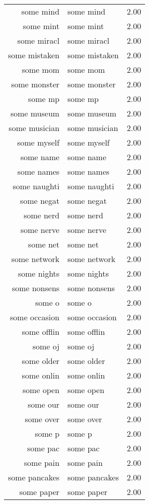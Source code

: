 \begin{table}[ht]
\begin{tabular}{rlr}
  some mind & some mind & 2.00 \\ 
  some mint & some mint & 2.00 \\ 
  some miracl & some miracl & 2.00 \\ 
  some mistaken & some mistaken & 2.00 \\ 
  some mom & some mom & 2.00 \\ 
  some monster & some monster & 2.00 \\ 
  some mp & some mp & 2.00 \\ 
  some museum & some museum & 2.00 \\ 
  some musician & some musician & 2.00 \\ 
  some myself & some myself & 2.00 \\ 
  some name & some name & 2.00 \\ 
  some names & some names & 2.00 \\ 
  some naughti & some naughti & 2.00 \\ 
  some negat & some negat & 2.00 \\ 
  some nerd & some nerd & 2.00 \\ 
  some nerve & some nerve & 2.00 \\ 
  some net & some net & 2.00 \\ 
  some network & some network & 2.00 \\ 
  some nights & some nights & 2.00 \\ 
  some nonsens & some nonsens & 2.00 \\ 
  some o & some o & 2.00 \\ 
  some occasion & some occasion & 2.00 \\ 
  some offlin & some offlin & 2.00 \\ 
  some oj & some oj & 2.00 \\ 
  some older & some older & 2.00 \\ 
  some onlin & some onlin & 2.00 \\ 
  some open & some open & 2.00 \\ 
  some our & some our & 2.00 \\ 
  some over & some over & 2.00 \\ 
  some p & some p & 2.00 \\ 
  some pac & some pac & 2.00 \\ 
  some pain & some pain & 2.00 \\ 
  some pancakes & some pancakes & 2.00 \\ 
  some paper & some paper & 2.00 \\ 

\end{tabular}
\end{table}
